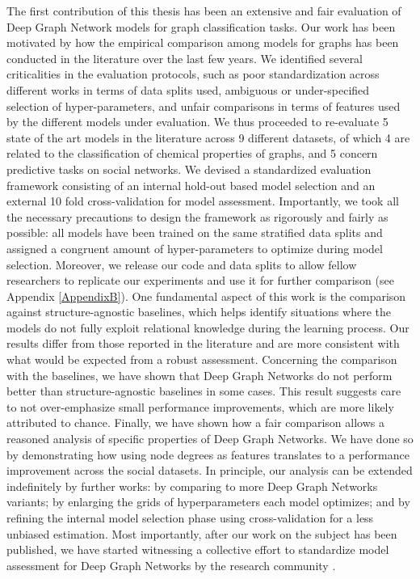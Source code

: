 The first contribution of this thesis has been an extensive and fair evaluation of Deep Graph Network models for graph classification tasks. Our work has been motivated by how the empirical comparison among models for graphs has been conducted in the literature over the last few years. We identified several criticalities in the evaluation protocols, such as poor standardization across different works in terms of data splits used, ambiguous or under-specified selection of hyper-parameters, and unfair comparisons in terms of features used by the different models under evaluation. We thus proceeded to re-evaluate 5 state of the art models in the literature across 9 different datasets, of which 4 are related to the classification of chemical properties of graphs, and 5 concern predictive tasks on social networks. We devised a standardized evaluation framework consisting of an internal hold-out based model selection and an external 10 fold cross-validation for model assessment. Importantly, we took all the necessary precautions to design the framework as rigorously and fairly as possible: all models have been trained on the same stratified data splits and assigned a congruent amount of hyper-parameters to optimize during model selection. Moreover, we release our code and data splits to allow fellow researchers to replicate our experiments and use it for further comparison (see Appendix \ref{AppendixB}). One fundamental aspect of this work is the comparison against structure-agnostic baselines, which helps identify situations where the models do not fully exploit relational knowledge during the learning process. Our results differ from those reported in the literature and are more consistent with what would be expected from a robust assessment. Concerning the comparison with the baselines, we have shown that Deep Graph Networks do not perform better than structure-agnostic baselines in some cases. This result suggests care to not over-emphasize small performance improvements, which are more likely attributed to chance. Finally, we have shown how a fair comparison allows a reasoned analysis of specific properties of Deep Graph Networks. We have done so by demonstrating how using node degrees as features translates to a performance improvement across the social datasets. In principle, our analysis can be extended indefinitely by further works: by comparing to more Deep Graph Networks variants; by enlarging the grids of hyperparameters each model optimizes; and by refining the internal model selection phase using cross-validation for a less unbiased estimation. Most importantly, after our work on the subject has been published, we have started witnessing a collective effort to standardize model assessment for Deep Graph Networks by the research community \citep{hu2020ogb,morris2020tudatasets}.
\vspace{1em}


